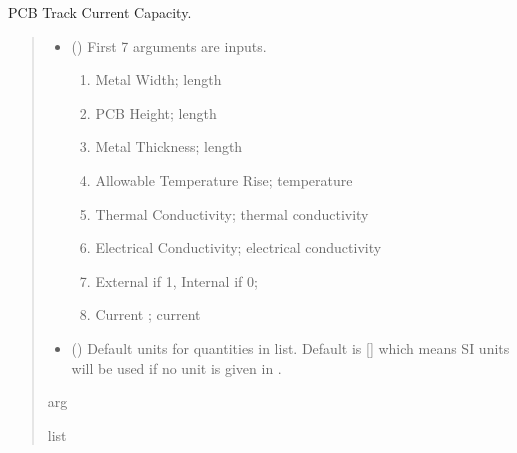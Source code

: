 \documentclass[letterpaper,10pt,english]{sphinxmanual}
\begin{document}

\begin{fulllineitems}
\label{\detokenize{components:components.PCBTrackCurrentCapacity}}
\pysigstartsignatures
{}
\pysigstopsignatures
\sphinxAtStartPar
PCB Track Current Capacity.
\begin{quote}\begin{description}
\begin{itemize}
\item {}
\sphinxAtStartPar
{} () \textendash{}
\sphinxAtStartPar
First 7 arguments are inputs.
\begin{enumerate}
%
\item {}
\sphinxAtStartPar
Metal Width;  length

\item {}
\sphinxAtStartPar
PCB Height;     length

\item {}
\sphinxAtStartPar
Metal Thickness;        length

\item {}
\sphinxAtStartPar
Allowable Temperature Rise; temperature

\item {}
\sphinxAtStartPar
Thermal Conductivity;  thermal conductivity

\item {}
\sphinxAtStartPar
Electrical Conductivity; electrical conductivity

\item {}
\sphinxAtStartPar
External if 1, Internal if 0;

\item {}
\sphinxAtStartPar
Current ; current

\end{enumerate}


\item {}
\sphinxAtStartPar
{} (\sphinxstyleliteralemphasis{\sphinxupquote{, }}) \textendash{} Default units for quantities in  list. Default is {[}{]} which means SI units will be used if no unit is given in .

\end{itemize}

\sphinxAtStartPar
arg

\sphinxAtStartPar
list

\end{description}\end{quote}

\end{fulllineitems}
\end{document}

